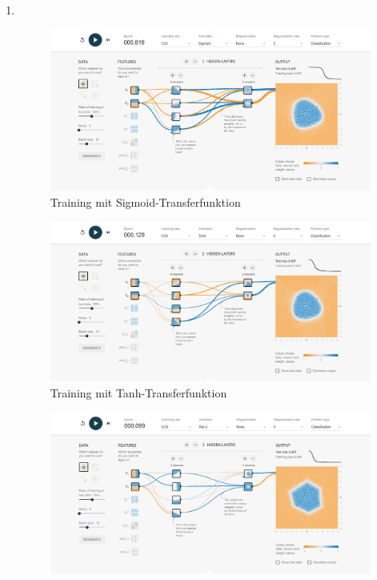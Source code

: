 \documentclass[DIN, pagenumber=false, fontsize=11pt, parskip=half]{scrartcl}
\begin{document}
    \subsection{}
    \begin{enumerate}[label=\alph*)]
        \item $ $
            \begin{figure}[H]
                \centering
                \includegraphics[width=\textwidth]{sigmoid.png}
                \caption{Training mit Sigmoid-Transferfunktion}
            \end{figure}
            \begin{figure}[H]
                \centering
                \includegraphics[width=\textwidth]{tanh.png}
                \caption{Training mit Tanh-Transferfunktion}
            \end{figure}
            \begin{figure}[H]
                \centering
                \includegraphics[width=\textwidth]{relu.png}

\end{figure}
\end{enumerate}
\end{document}
